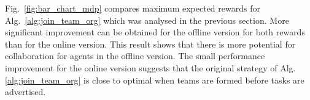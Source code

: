 \documentclass{llncs}
\begin{document}
Fig.~\ref{fig:bar_chart_mdp} compares maximum expected rewards for Alg.~\ref{alg:join_team_org} which was analysed  in the previous section. More significant improvement can be obtained for the offline version for both rewards than for the online version. This result shows that there is more potential for collaboration for agents in the offline version. The small performance improvement for the online version suggests that the original strategy of Alg. \ref{alg:join_team_org} is close to optimal when teams are formed before tasks are advertised.


%
%
%
\vspace{-10mm}
\end{document}

